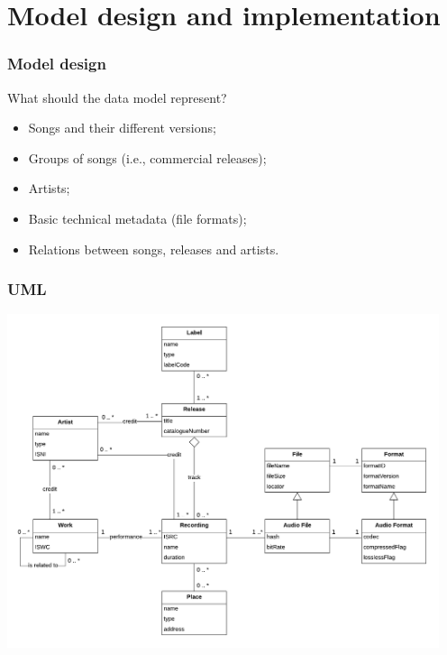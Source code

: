 \documentclass{beamer}
\begin{document}
\section{Model design and implementation}


  \begin{frame}
    \frametitle{Model design}

    What should the data model represent?

    \vspace{1em}

    \begin{itemize}
      \itemsep0.75em
      \item Songs and their different versions;
      \item Groups of songs (i.e., commercial releases);
      \item Artists;
      \item Basic technical metadata (file formats);
      \item Relations between songs, releases and artists.
    \end{itemize}

  \end{frame}



  \begin{frame}
    \frametitle{UML}
    \begin{center}
      \includegraphics[width=0.95\textwidth]{img/UML.pdf}
    \end{center}
  \end{frame}
\end{document}
